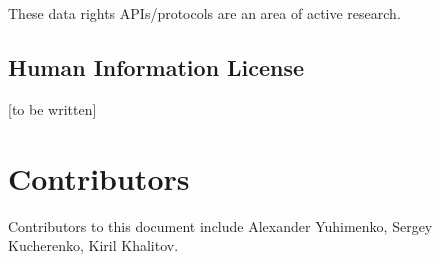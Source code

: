 \documentclass[11pt, oneside]{article}   	%
\begin{document}
These data rights APIs/protocols are an area of active research.  
    
\subsection{Human Information License}
[to be written]

\section{Contributors}
Contributors to this document include Alexander Yuhimenko, Sergey Kucherenko, Kiril Khalitov.   



\end{document}
